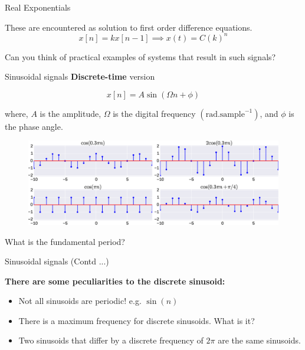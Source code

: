 \documentclass{beamer}
\begin{document}
\begin{frame}[t]{Real Exponentials}

These are encountered as solution to first order difference equations.
\[ x[n] = kx[n-1] \implies x(t) = C(k)^n \]

Can you think of practical examples of systems that result in such signals?
\end{frame}

%
%
%
%

\begin{frame}[t]{Sinusoidal signals}
\textbf{Discrete-time} version

\[ x[n] = A \sin \left(\Omega n + \phi\right) \]

where, $A$ is the amplitude, $\Omega$ is the digital frequency $\left(\mathrm{rad}.\mathrm{sample}^{-1}\right)$, and $\phi$ is the phase angle.

\begin{figure}
\includegraphics[width=\textwidth]{img/disc_sinu.eps}
\end{figure}

What is the fundamental period?
\end{frame}

\begin{frame}[t]{Sinusoidal signals (Contd ...)}

\textbf{There are some peculiarities to the discrete sinusoid:}
\begin{itemize}
\item Not all sinusoids are periodic! e.g. $\sin(n)$
\item There is a maximum frequency for discrete sinusoids. What is it?
\item Two sinusoids that differ by a discrete frequency of $2\pi$ are the same sinusoids.
\end{itemize}

\end{frame}
\end{document}
